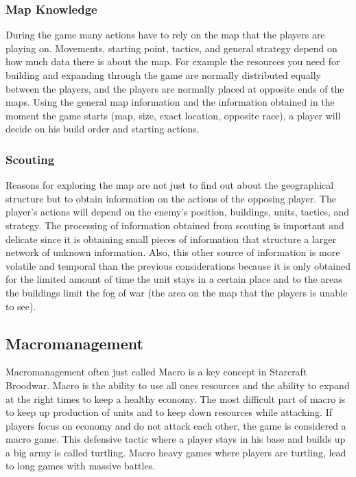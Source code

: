 			\subsubsection{Map Knowledge}
				During the game many actions have to rely on the map that the players are playing on. Movements, starting point, 
				tactics, and general strategy depend on how much data there is about the map. 				
				For example the resources you need for building and expanding through the game are normally distributed
				equally between the players, and the players are normally placed at opposite ends of the maps. 
				Using the general map information and the information obtained in the moment the game starts 
				(map, size, exact location, opposite race), a player will decide on his build order and starting actions. 
		
			\subsubsection{Scouting}
				Reasons for exploring the map are not just to find out about the geographical structure 
				but to obtain information on the actions of the opposing player. The player's actions will depend on
				the enemy's position, buildings, units, tactics, and strategy. The processing of information 
				obtained from scouting is important and delicate since it is obtaining small pieces of information 
				that structure a larger network of unknown information. Also, this other source of information 
				is more volatile and temporal than the previous considerations because it is only obtained for the 
				limited amount of time the unit stays in a certain place and to the areas the buildings limit the fog of war (the area on the map that the players is unable to see).
				
	\subsection{Macromanagement}
		Macromanagement often just called Macro is a key concept in Starcraft Broodwar. 
		Macro is the ability to use all ones resources and the ability to expand at the right times to keep a healthy economy.
		The most difficult part of macro is to keep up production of units and to keep down resources while attacking.
		If players focus on economy and do not attack each other, the game is considered a macro game. This defensive tactic where a
		player stays in his base and builds up a big army is called turtling. Macro heavy games where players are turtling, lead to
		long games with massive battles. 
			
